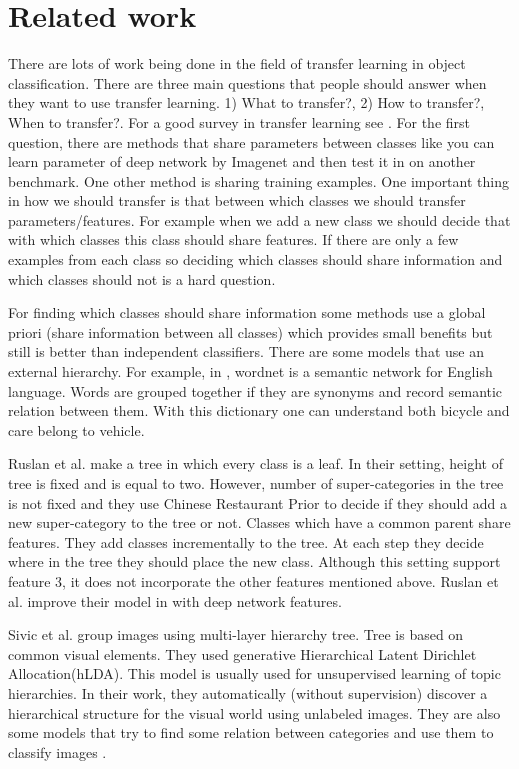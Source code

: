 \documentclass[10pt,twocolumn,letterpaper]{article}
\begin{document}
\section{Related work}

There are lots of work being done in the field of transfer learning in object
classification. There are three main questions that people should answer when
they want to use transfer learning. 1) What to transfer?,  2) How to transfer?,
When to transfer?. For a good survey in transfer learning see
\cite{transfersurvey}. For the first question, there are methods that share
parameters between classes like you can learn parameter of deep network
\cite{deepnetwork} by Imagenet \cite{imagenet} and then test it in on another
benchmark. One other method is sharing training examples.  One important
thing in how we should transfer is that between which classes we should
transfer parameters/features. For example when we add a new class we
should decide that with which classes this class should share features.
If there are only a few examples from each class so deciding which
classes should share information and which classes should not is a hard
question.

For finding which classes should share information some methods use a global
priori \cite{priori} (share information between all classes) which provides
small benefits but still is better than independent classifiers. There are some
models \cite{semantic} that use an external hierarchy. For example, in
\cite{semantic}, wordnet \cite{wordnet} is a semantic network for English
language. Words are grouped together if they are synonyms and record semantic
relation between them. With this dictionary one can understand both bicycle and
care belong to vehicle.


Ruslan et al. \cite{ruslan} make a tree in which every class is a leaf. In
their setting, height of tree is fixed and is equal to two. However, number of
super-categories in the tree is not fixed and they use Chinese Restaurant Prior \cite{CRP} 
to decide if they should add
a new super-category to the tree or not. Classes which have a common parent share
features. They add classes incrementally to the tree. At each step they decide
where in the tree they should place the new class. Although this setting support
feature 3, it does not incorporate the other features mentioned above. 
Ruslan et al. improve  their model in \cite{ruslan2} with deep network features.

Sivic et al. \cite{sivic} group images using multi-layer hierarchy tree. Tree
is based on common visual elements. They used generative Hierarchical Latent
Dirichlet Allocation(hLDA)\cite{hlda}. This model is usually used for unsupervised learning of topic
hierarchies. In their work, they automatically (without supervision) discover a
hierarchical structure for the visual world using unlabeled images. They are
also some models that try to find some relation between categories and use them
to classify images \cite{transfer22}.
\end{document}
